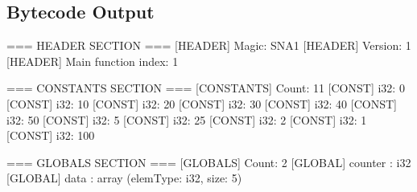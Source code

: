 \documentclass[a4paper,12pt]{article}
\begin{document}
    \subsection{Bytecode Output}
    \begin{spverbatim}
        === HEADER SECTION ===
        [HEADER] Magic: SNA1
        [HEADER] Version: 1
        [HEADER] Main function index: 1

        === CONSTANTS SECTION ===
        [CONSTANTS] Count: 11
        [CONST] i32: 0
        [CONST] i32: 10
        [CONST] i32: 20
        [CONST] i32: 30
        [CONST] i32: 40
        [CONST] i32: 50
        [CONST] i32: 5
        [CONST] i32: 25
        [CONST] i32: 2
        [CONST] i32: 1
        [CONST] i32: 100

        === GLOBALS SECTION ===
        [GLOBALS] Count: 2
        [GLOBAL] counter : i32
        [GLOBAL] data : array (elemType: i32, size: 5)


\end{spverbatim}
\end{document}
